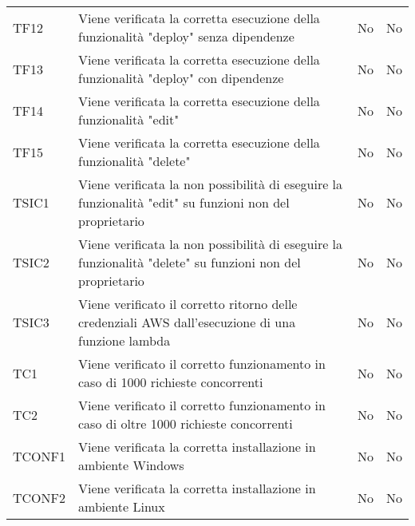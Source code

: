 \begin{longtable}{
		>{\centering}p{}
		>{}p{}
		>{\centering}p{}
		>{\centering}p{} }
		TF12 & Viene verificata la corretta esecuzione della funzionalità "deploy" senza dipendenze &
		No &
		No \tabularnewline
		
		TF13 & Viene verificata la corretta esecuzione della funzionalità "deploy" con dipendenze &
		No &
		No \tabularnewline
		
		TF14 & Viene verificata la corretta esecuzione della funzionalità "edit" &
		No &
		No \tabularnewline
		
		TF15 & Viene verificata la corretta esecuzione della funzionalità "delete" &
		No &
		No \tabularnewline
		
		
		
		
		TSIC1 & Viene verificata la non possibilità di eseguire la funzionalità "edit" su funzioni non del proprietario &
		No &
		No \tabularnewline
		
		TSIC2 & Viene verificata la non possibilità di eseguire la funzionalità "delete" su funzioni non del proprietario &
		No &
		No \tabularnewline
		
		TSIC3 & Viene verificato il corretto ritorno delle credenziali AWS\ped{\textit{G}} dall'esecuzione di una funzione lambda\ped{\textit{G}} &
		No &
		No \tabularnewline
		
		
		
		







		TC1 & Viene verificato il corretto funzionamento in caso di 1000 richieste concorrenti &
		No &
		No \tabularnewline
		



		TC2 & Viene verificato il corretto funzionamento in caso di oltre 1000 richieste concorrenti &
		No &
		No \tabularnewline
		
		
		
		
		TCONF1 & Viene verificata la corretta installazione in ambiente Windows &
		No &
		No \tabularnewline
		
		TCONF2 & Viene verificata la corretta installazione in ambiente Linux &
		No &
		No \tabularnewline


\end{longtable}
